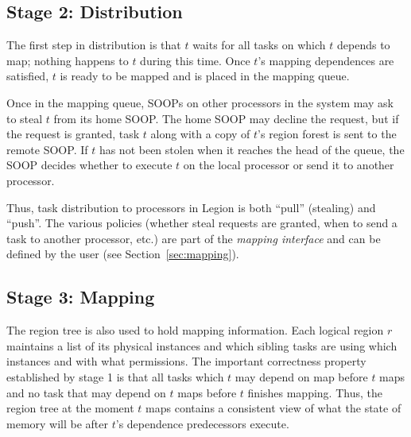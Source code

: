 \subsection{Stage 2: Distribution}
\label{sec:dist}

The first step in distribution is that $t$ waits for all tasks on which $t$ depends to
map; nothing happens to $t$ during this time.  Once $t$'s mapping
dependences are satisfied, $t$ is ready to be mapped and is placed
in the mapping queue.

Once in the mapping queue, SOOPs on other processors in the system may
ask to steal $t$ from its home SOOP.  The home SOOP may decline the
request, but if the request is granted, task $t$ along with a copy of
$t$'s region forest is sent to the remote SOOP.  If $t$ has not been
stolen when it reaches the head of the queue, the SOOP decides whether
to execute $t$ on the local processor or send it to another processor.

Thus, task distribution to processors in Legion is both ``pull'' (stealing) and ``push''.
The various policies (whether steal requests are granted, when to send
a task to another processor, etc.) are part of the {\em mapping interface}
and can be defined by the user (see Section~\ref{sec:mapping}).


\subsection{Stage 3: Mapping}
\label{sec:map}


The region tree is also used to hold mapping information.  Each logical region $r$ maintains a
list of its physical instances and which sibling tasks are using which
instances and with what permissions.  The important correctness
property established by stage 1 is that all
tasks which $t$ may depend on map before $t$ maps and no task that may depend on
$t$ maps before $t$ finishes mapping.  Thus, the region tree at the
moment $t$ maps contains a consistent view of what the state of memory
will be after $t$'s dependence predecessors execute.

